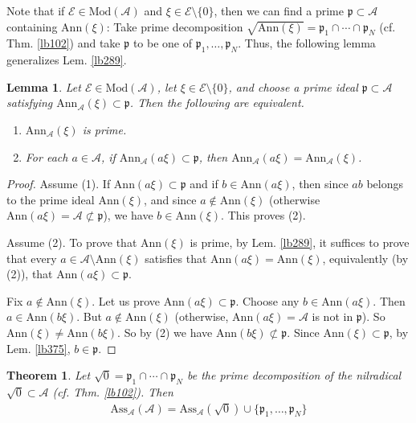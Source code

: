 \documentclass[12pt,b5paper,notitlepage]{report}
\theoremstyle{definition}
\theoremstyle{plain}
\newtheorem{thm}[df]{Theorem}
\newtheorem{lm}[df]{Lemma}
\newcommand{\mc}{\mathcal}
\newcommand{\pk}{\mathfrak p}
\newcommand{\Ann}{\mathrm{Ann}}
\newcommand{\Mod}{\mathrm{Mod}}
\newcommand{\Ass}{\mathrm{Ass}}
\numberwithin{equation}{section}
\begin{document}
Note that if $\mc E\in\Mod(\mc A)$ and $\xi\in\mc E\setminus\{0\}$, then we can find a prime $\pk\subset\mc A$ containing $\Ann(\xi)$: Take prime decomposition $\sqrt{\Ann(\xi)}=\pk_1\cap\cdots\cap \pk_N$ (cf. Thm. \ref{lb102}) and take $\pk$ to be one of $\pk_1,\dots,\pk_N$. Thus, the following lemma generalizes Lem. \ref{lb289}.

\begin{lm}\label{lb370}
Let $\mc E\in\Mod(\mc A)$, let $\xi\in\mc E\setminus\{0\}$, and choose a prime ideal $\pk\subset\mc A$ satisfying $\Ann_{\mc A}(\xi)\subset\pk$. Then the following are equivalent.
\begin{enumerate}[label=(\arabic*)]
\item $\Ann_{\mc A}(\xi)$ is prime.
\item For each $a\in\mc A$, if $\Ann_{\mc A}(a\xi)\subset\pk$, then $\Ann_{\mc A}(a\xi)=\Ann_{\mc A}(\xi)$.
\end{enumerate}
\end{lm}




\begin{proof}
Assume (1). If $\Ann(a\xi)\subset\pk$ and if $b\in\Ann(a\xi)$, then since $ab$ belongs to the prime ideal $\Ann(\xi)$, and since $a\notin\Ann(\xi)$ (otherwise $\Ann(a\xi)=\mc A\nsubset\pk$), we have $b\in\Ann(\xi)$. This proves (2).

Assume (2). To prove that $\Ann(\xi)$ is prime, by Lem. \ref{lb289}, it suffices to prove that every $a\in\mc A\setminus\Ann(\xi)$ satisfies that $\Ann(a\xi)=\Ann(\xi)$, equivalently (by (2)), that $\Ann(a\xi)\subset\pk$.

Fix $a\notin\Ann(\xi)$. Let us prove $\Ann(a\xi)\subset\pk$. Choose any $b\in\Ann(a\xi)$. Then $a\in\Ann(b\xi)$. But $a\notin\Ann(\xi)$ (otherwise, $\Ann(a\xi)=\mc A$ is not in $\pk$). So $\Ann(\xi)\neq\Ann(b\xi)$. So by (2) we have $\Ann(b\xi)\nsubset\pk$. Since $\Ann(\xi)\subset\pk$, by Lem. \ref{lb375}, $b\in\pk$.
\end{proof}



\begin{thm}\label{lb372}
Let $\sqrt{0}=\pk_1\cap\cdots\cap\pk_N$ be the prime decomposition of the nilradical $\sqrt{0}\subset\mc A$ (cf. Thm. \ref{lb102}). Then
\begin{align}
\Ass_{\mc A}(\mc A)=\Ass_{\mc A}(\sqrt{0})\cup\{\pk_1,\dots,\pk_N\} \label{eq192}
\end{align}
\end{thm}
\end{document}
